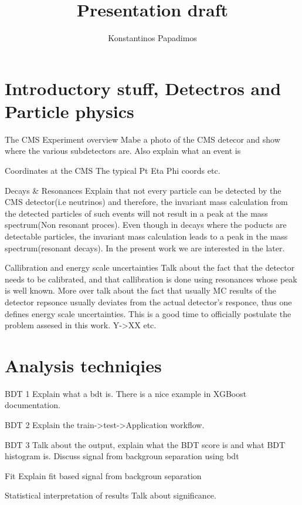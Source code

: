 \documentclass[bigger]{beamer}
\author{Konstantinos Papadimos}
\date{}
\title{Presentation draft}
\begin{document}
\maketitle

\section{Introductory stuff, Detectros and Particle physics}
\label{sec:orgd9a4080}
\begin{frame}[label={sec:org35e3fc7}]{The CMS Experiment overview}
Mabe a photo of the CMS detecor and show where the various subdetectors are. Also explain what an event is
\end{frame}
\begin{frame}[label={sec:org2ebafb4}]{Coordinates at the CMS}
The typical Pt Eta Phi coords etc.
\end{frame}
\begin{frame}[label={sec:org474a9db}]{Decays \& Resonances}
Explain that not every particle can be detected by the CMS detector(i.e neutrinos) and therefore, the invariant mass calculation from the detected particles of such events will not result in a peak at the mass spectrum(Non resonant proces). Even though in decays where  the poducts are detectable particles, the invariant mass calculation leads to a peak in the mass spectrum(resonant decays). In the present work we are interested in the later.
\end{frame}
\begin{frame}[label={sec:org473c110}]{Callibration and energy scale uncertainties}
Talk about the fact that the detector needs to be calibrated, and that callibration is done using resonances whose peak is well known. More over talk about the fact that usually MC results of the detector repsonce usually deviates from the actual detector's responce, thus one defines energy scale uncertainties. This is a good time to officially postulate the problem assesed in  this work. Y->XX etc. 
\end{frame}
\section{Analysis techniqies}
\label{sec:orgc840f81}
\begin{frame}[label={sec:orgf0ddcac}]{BDT 1}
Explain what a bdt is. There is a nice example in XGBoost documentation. 
\end{frame}
\begin{frame}[label={sec:org7f6de4e}]{BDT 2}
Explain the train->test->Application workflow. 
\end{frame}
\begin{frame}[label={sec:org4ff7568}]{BDT 3}
Talk about the output, explain what the BDT score is and what BDT histogram is. Discuss signal from backgroun separation using bdt
\end{frame}
\begin{frame}[label={sec:org6979cbd}]{Fit}
Explain fit based signal from backgroun separation
\end{frame}
\begin{frame}[label={sec:org336f18e}]{Statistical interpretation of results}
Talk about significance.
\end{frame}
\end{document}
